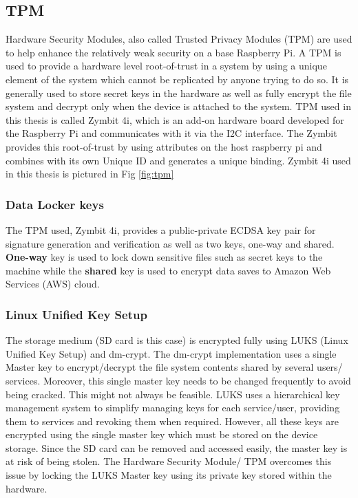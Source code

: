 \documentclass[11pt,openright]{report}
\begin{document}
\subsection{TPM}
Hardware Security Modules, also called Trusted Privacy Modules \cite{article} (TPM) are used to help enhance the relatively weak security on a base Raspberry Pi. A TPM is used to provide a hardware level root-of-trust in a system by using a unique element of the system which cannot be replicated by anyone trying to do so. It is generally used to store secret keys in the hardware as well as fully encrypt the file system and decrypt only when the device is attached to the system. TPM used in this thesis is called Zymbit 4i, which is an add-on hardware board developed for the Raspberry Pi and communicates with it via the I2C interface. The Zymbit provides this root-of-trust by using attributes on the host raspberry pi and combines with its own Unique ID and generates a unique binding. Zymbit 4i used in this thesis is pictured in Fig \ref{fig:tpm} 

\subsubsection{Data Locker keys}
The TPM used, Zymbit 4i, provides a public-private ECDSA key pair for signature generation and verification as well as two keys, one-way and shared. \textbf{One-way} key is used to lock down sensitive files such as secret keys to the machine while the \textbf{shared} key is used to encrypt data saves to Amazon Web Services (AWS) cloud. 

\subsubsection{Linux Unified Key Setup}
The storage medium (SD card is this case) is encrypted fully using LUKS \cite{cryptoeprint:2016:274} (Linux Unified Key Setup) and dm-crypt. The dm-crypt implementation uses a single Master key to encrypt/decrypt the file system contents shared by several users/ services. Moreover, this single master key needs to be changed frequently to avoid being cracked. This might not always be feasible. LUKS uses a hierarchical key management system to simplify managing keys for each service/user, providing them to services and revoking them when required. However, all these keys are encrypted using the single master key which must be stored on the device storage. Since the SD card can be removed and accessed easily, the master key is at risk of being stolen. The Hardware Security Module/ TPM overcomes this issue by locking the LUKS Master key using its private key stored within the hardware.
\end{document}
